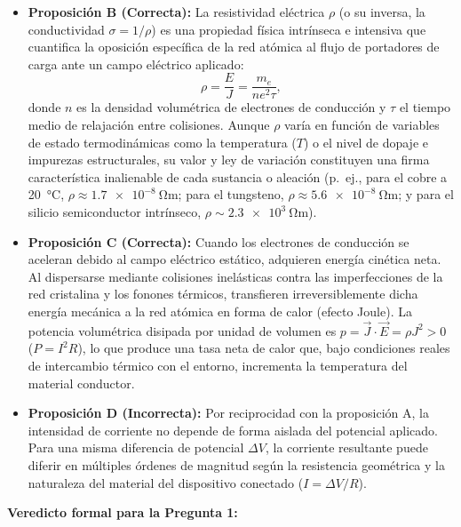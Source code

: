 \begin{appendices}
\begin{itemize}
    \item \textbf{Proposición B (Correcta):} La resistividad eléctrica $\rho$ (o su inversa, la conductividad $\sigma = 1/\rho$) es una propiedad física intrínseca e intensiva que cuantifica la oposición específica de la red atómica al flujo de portadores de carga ante un campo eléctrico aplicado:
    \begin{equation}
        \rho = \frac{E}{J} = \frac{m_e}{n e^2 \tau},
    \end{equation}
    donde $n$ es la densidad volumétrica de electrones de conducción y $\tau$ el tiempo medio de relajación entre colisiones. Aunque $\rho$ varía en función de variables de estado termodinámicas como la temperatura ($T$) o el nivel de dopaje e impurezas estructurales, su valor y ley de variación constituyen una firma característica inalienable de cada sustancia o aleación (p.~ej., para el cobre a \qty{20}{\celsius}, $\rho \approx \qty{1,7e-8}{\ohm\metre}$; para el tungsteno, $\rho \approx \qty{5,6e-8}{\ohm\metre}$; y para el silicio semiconductor intrínseco, $\rho \sim \qty{2,3e3}{\ohm\metre}$).
    
    \item \textbf{Proposición C (Correcta):} Cuando los electrones de conducción se aceleran debido al campo eléctrico estático, adquieren energía cinética neta. Al dispersarse mediante colisiones inelásticas contra las imperfecciones de la red cristalina y los fonones térmicos, transfieren irreversiblemente dicha energía mecánica a la red atómica en forma de calor (efecto Joule). La potencia volumétrica disipada por unidad de volumen es $p = \vec{J} \cdot \vec{E} = \rho J^2 > 0$ ($P = I^2 R$), lo que produce una tasa neta de calor que, bajo condiciones reales de intercambio térmico con el entorno, incrementa la temperatura del material conductor.
    
    \item \textbf{Proposición D (Incorrecta):} Por reciprocidad con la proposición A, la intensidad de corriente no depende de forma aislada del potencial aplicado. Para una misma diferencia de potencial $\Delta V$, la corriente resultante puede diferir en múltiples órdenes de magnitud según la resistencia geométrica y la naturaleza del material del dispositivo conectado ($I = \Delta V / R$).
\end{itemize}

\textbf{Veredicto formal para la Pregunta 1:}  
\begin{center}
\end{center}


\end{appendices}
